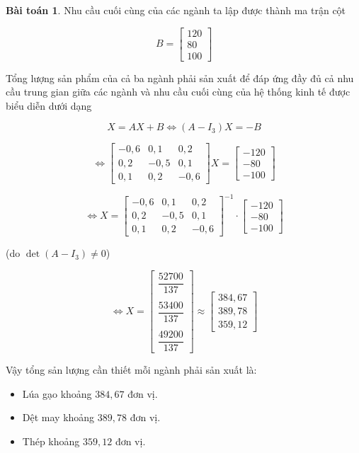 \documentclass[12pt,a4paper,oneside]{book}
\theoremstyle{theorem}
\theoremstyle{definition}
\newtheorem{bt}[theorem2]{Bài toán}
\begin{document}
\begin{bt}
Nhu cầu cuối cùng của các ngành ta lập được thành ma trận cột

\[
B=
\begin{bmatrix}
120\\
80\\
100
\end{bmatrix}
\]

Tổng lượng sản phẩm của cả ba ngành phải sản xuất để đáp ứng đầy đủ cả
nhu cầu trung gian giữa các ngành và nhu cầu cuối cùng của hệ thống kinh tế
được biểu diễn dưới dạng

\[
X=AX+B
\Leftrightarrow
(A-I_3)X=-B
\]

\[
\Leftrightarrow
\begin{bmatrix}
-0,6 & 0,1 & 0,2\\
0,2 & -0,5 & 0,1\\
0,1 & 0,2 & -0,6
\end{bmatrix}
X=
\begin{bmatrix}
-120\\
-80\\
-100
\end{bmatrix}
\]

\[
\Leftrightarrow
X=
\begin{bmatrix}
-0,6 & 0,1 & 0,2\\
0,2 & -0,5 & 0,1\\
0,1 & 0,2 & -0,6
\end{bmatrix}^{-1}
\cdot
\begin{bmatrix}
-120\\
-80\\
-100
\end{bmatrix}
\]

(do \(\det(A-I_3)\neq0\))

\[
\Leftrightarrow
X=
\begin{bmatrix}
\dfrac{52700}{137}\\
\\

\dfrac{53400}{137}\\
\\

\dfrac{49200}{137}
\end{bmatrix}
\approx
\begin{bmatrix}
384,67\\
389,78\\
359,12
\end{bmatrix}
\]

Vậy tổng sản lượng cần thiết mỗi ngành phải sản xuất là:

\begin{itemize}
    \item Lúa gạo khoảng \(384,67\) đơn vị.
    \item Dệt may khoảng \(389,78\) đơn vị.
    \item Thép khoảng \(359,12\) đơn vị.
\end{itemize}
  \end{bt}
 
\end{document}

